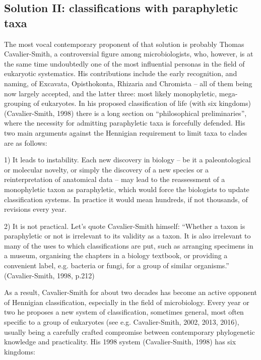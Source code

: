 \begin{artengenv}
\subsection{Solution II: classifications with paraphyletic taxa}

The most vocal contemporary proponent of that solution is probably Thomas Cavalier-Smith, a controversial figure among
microbiologists, who, however, is at the same time undoubtedly one of the most influential personas in the field of
eukaryotic systematics. His contributions include the early recognition, and naming, of Excavata, Opisthokonta,
Rhizaria and Chromista – all of them being now largely accepted, and the latter three: most likely monophyletic,
mega-grouping of eukaryotes. In his proposed classification of life (with six kingdoms)
\label{ref:RNDScaXMIFqT5}(Cavalier-Smith, 1998) there is a long section on “philosophical preliminaries”, where the
necessity for admitting paraphyletic taxa is forcefully defended. His two main arguments against the Hennigian
requirement to limit taxa to clades are as follows:

1) It leads to instability. Each new discovery in biology – be it a paleontological or molecular novelty, or simply the
discovery of a new species or a reinterpretation of anatomical data – may lead to the reassessment of a monophyletic
taxon as paraphyletic, which would force the biologists to update classification systems. In practice it would mean
hundreds, if not thousands, of revisions every year.

2) It is not practical. Let’s quote Cavalier-Smith himself: “Whether a taxon is paraphyletic or not is irrelevant to its
validity as a taxon. It is also irrelevant to many of the uses to which classifications are put, such as arranging
specimens in a museum, organising the chapters in a biology textbook, or providing a convenient label, e.g. bacteria or
fungi, for a group of similar organisms.” \label{ref:RNDUlTuwI9YEO}(Cavalier-Smith, 1998, p.212)

As a result, Cavalier-Smith for about two decades has become an active opponent of Hennigian classification, especially
in the field of microbiology. Every year or two he proposes a new system of classification, sometimes general, most
often specific to a group of eukaryotes \label{ref:RNDtoAIslWhri}(see e.g. Cavalier-Smith, 2002, 2013, 2016), usually
being a carefully crafted compromise between contemporary phylogenetic knowledge and practicality. His 1998 system
\label{ref:RNDJbJ6dU4tG1}(Cavalier-Smith, 1998) has six kingdoms:


\end{artengenv}
